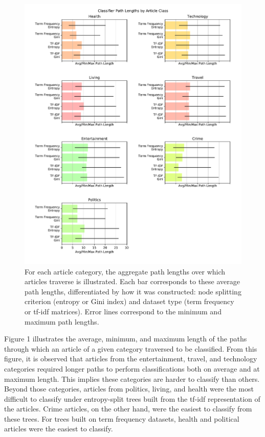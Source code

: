 \documentclass[11pt]{article}
\begin{document}
\begin{figure}[h!] \label{fig:pathlengths}
  \centering
  \includegraphics[width=\textwidth]{figures/decision_tree/path_depths}
  \caption{For each article category, the aggregate path lengths over which articles traverse is illustrated.
  Each bar corresponds to these average path lengths, differentiated by how it was constructed: node splitting criterion (entropy or Gini index) and dataset type (term frequency or tf-idf matrices).
  Error lines correspond to the minimum and maximum path lengths.}
\end{figure}


Figure 1 illustrates the average, minimum, and maximum length of the paths through which an article of a given category traversed to be classified.
From this figure, it is observed that articles from the entertainment, travel, and technology categories required longer paths to perform classifications both on average and at maximum length.
This implies these categories are harder to classify than others.
Beyond those categories, articles from politics, living, and health were the most difficult to classify under entropy-split trees built from the tf-idf representation of the articles.
Crime articles, on the other hand, were the easiest to classify from these trees.
For trees built on term frequency datasets, health and political articles were the easiest to classify.
\end{document}
